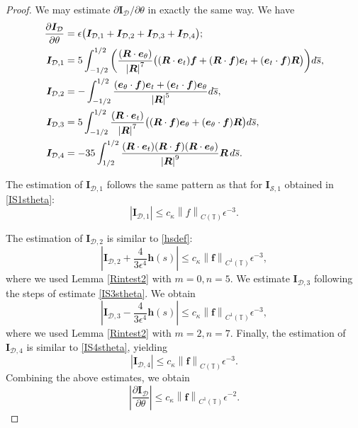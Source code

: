\documentclass[11pt]{article}
\numberwithin{equation}{section}
\newcommand{\T}{\mathbb{T}}
\newcommand{\bars}{\overline s}
\newcommand{\be}{\bm{e}}
\newcommand{\p}{\partial}
\newcommand{\ts}{\thinspace}
\newcommand{\abs}[1]{\left\lvert #1 \right\rvert}
\newcommand{\norm}[1]{\left\lVert #1 \right\rVert}
\newcommand{\mc}[1]{\mathcal{#1}}
\theoremstyle{definition}
\begin{document}
\begin{proof}
We may estimate $\partial \bm{I}_{\mc{D}}/\partial \theta$ in exactly the same way. We have
\begin{equation}\label{IDstheta}
\begin{split}
\frac{\p \bm{I}_{\mc D}}{\p \theta} &= \epsilon \big(\bm{I}_{\mc{D},1}+\bm{I}_{\mc{D},2} +\bm{I}_{\mc{D},3}+\bm{I}_{\mc{D},4}\big); \\
\bm{I}_{\mc{D},1} &= 5\int_{-1/2}^{1/2}\bigg(\frac{(\bm{R}\cdot\bm{e}_\theta)}{\abs{\bm{R}}^7} \big((\bm{R}\cdot\be_t)\bm{f}+(\bm{R}\cdot \bm{f})\be_t +(\be_t\cdot \bm{f})\bm{R} \big) \bigg) d\bars, \\
\bm{I}_{\mc{D},2} &= -\int_{-1/2}^{1/2}\frac{(\be_\theta\cdot \bm{f})\be_t +(\be_t\cdot \bm{f})\be_\theta}{\abs{\bm{R}}^5}d\bars,\\
\bm{I}_{\mc{D},3} &= 5\int_{-1/2}^{1/2}\frac{(\bm{R}\cdot\be_t)}{\abs{\bm{R}}^7} \big((\bm{R}\cdot\bm{f})\be_\theta+(\be_\theta\cdot\bm{f})\bm{R} \big) d\bars,\\
\bm{I}_{\mc{D},4}&=-35\int_{1/2}^{1/2} \frac{(\bm{R}\cdot\be_t)(\bm{R}\cdot\bm{f})(\bm{R}\cdot\be_\theta)}{\abs{\bm{R}}^9}\bm{R} \ts d\bars.
\end{split}
\end{equation}

The estimation of $\bm{I}_{\mc{D},1}$ follows the same pattern as that for $\bm{I}_{\mc{S},1}$ obtained in \eqref{IS1stheta}:
\[\abs{\bm{I}_{\mc{D},1}}\le c_\kappa\norm{f}_{C(\T)}\epsilon^{-3}. \]

The estimation of $\bm{I}_{\mc{D},2}$ is similar to \eqref{hsdef}:
\[ \abs{\bm{I}_{\mc{D},2}+\frac{4}{3\epsilon^4}\bm{h}(s)}\le c_\kappa\norm{\bm{f}}_{C^1(\T)}\epsilon^{-3}, \]
where we used Lemma \ref{Rintest2} with $m=0, n=5$. We estimate $\bm{I}_{\mc{D},3}$ following the steps of estimate \eqref{IS3stheta}. We obtain
\[ \abs{\bm{I}_{\mc{D},3}-\frac{4}{3\epsilon^4}\bm{h}(s)}\le c_\kappa\norm{\bm{f}}_{C^1(\T)}\epsilon^{-3}, \]
where we used Lemma \ref{Rintest2} with $m=2, n=7$. Finally, the estimation of $\bm{I}_{\mc{D},4}$ is similar to \eqref{IS4stheta}, yielding
\[ \abs{\bm{I}_{\mc{D},4}}\le c_\kappa\norm{\bm{f}}_{C(\T)}\epsilon^{-3}. \]
Combining the above estimates, we obtain
\begin{equation}\label{IDthetaest}
\abs{\frac{\p \bm{I}_{\mc{D}}}{\p \theta}}\le c_\kappa\norm{\bm{f}}_{C^1(\T)}\epsilon^{-2}.
\end{equation}


\end{proof}
\end{document}
